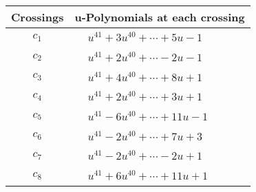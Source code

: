 \documentclass[1p]{elsarticle_modified}
\theoremstyle{definition}
\begin{document}
\begin{tabular}{m{50pt}|m{274pt}}
Crossings & \hspace{64pt}u-Polynomials at each crossing \\
\hline $$\begin{aligned}c_{1}\end{aligned}$$&$\begin{aligned}
&u^{41}+3 u^{40}+\cdots+5 u-1
\end{aligned}$\\
\hline $$\begin{aligned}c_{2}\end{aligned}$$&$\begin{aligned}
&u^{41}+2 u^{40}+\cdots-2 u-1
\end{aligned}$\\
\hline $$\begin{aligned}c_{3}\end{aligned}$$&$\begin{aligned}
&u^{41}+4 u^{40}+\cdots+8 u+1
\end{aligned}$\\
\hline $$\begin{aligned}c_{4}\end{aligned}$$&$\begin{aligned}
&u^{41}+2 u^{40}+\cdots+3 u+1
\end{aligned}$\\
\hline $$\begin{aligned}c_{5}\end{aligned}$$&$\begin{aligned}
&u^{41}-6 u^{40}+\cdots+11 u-1
\end{aligned}$\\
\hline $$\begin{aligned}c_{6}\end{aligned}$$&$\begin{aligned}
&u^{41}-2 u^{40}+\cdots+7 u+3
\end{aligned}$\\
\hline $$\begin{aligned}c_{7}\end{aligned}$$&$\begin{aligned}
&u^{41}-2 u^{40}+\cdots-2 u+1
\end{aligned}$\\
\hline $$\begin{aligned}c_{8}\end{aligned}$$&$\begin{aligned}
&u^{41}+6 u^{40}+\cdots+11 u+1
\end{aligned}$\\

\end{tabular}
\end{document}
